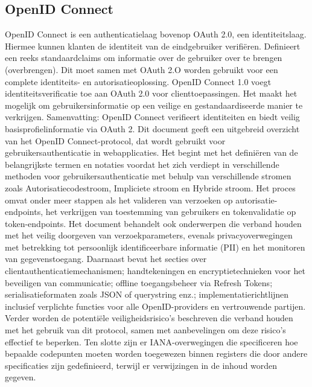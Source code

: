 \subsection{OpenID Connect}%
\label{subsec:openid-connect}
OpenID Connect is een authenticatielaag bovenop OAuth 2.0, een identiteitslaag. Hiermee kunnen klanten de identiteit van de eindgebruiker verifiëren. Definieert een reeks standaardclaims om informatie over de gebruiker over te brengen (overbrengen). Dit moet samen met OAuth 2.O worden gebruikt voor een complete identiteits- en autorisatieoplossing.
\newline
OpenID Connect 1.0 voegt identiteitsverificatie toe aan OAuth 2.0 voor clienttoepassingen.
Het maakt het mogelijk om gebruikersinformatie op een veilige en gestandaardiseerde manier te verkrijgen.
\newline
Samenvatting: OpenID Connect verifieert identiteiten en biedt veilig basisprofielinformatie via OAuth 2.
\newline
Dit document \autocite{Sakimura2014} geeft een uitgebreid overzicht van het OpenID Connect-protocol, dat wordt gebruikt voor gebruikersauthenticatie in webapplicaties. Het begint met het definiëren van de belangrijkste termen en notaties voordat het zich verdiept in verschillende methoden voor gebruikersauthenticatie met behulp van verschillende stromen zoals Autorisatiecodestroom, Impliciete stroom en Hybride stroom. Het proces omvat onder meer stappen als het valideren van verzoeken op autorisatie-endpoints, het verkrijgen van toestemming van gebruikers en tokenvalidatie op token-endpoints.
\newline
Het document behandelt ook onderwerpen die verband houden met het veilig doorgeven van verzoekparameters, evenals privacyoverwegingen met betrekking tot persoonlijk identificeerbare informatie (PII) en het monitoren van gegevenstoegang. Daarnaast bevat het secties over clientauthenticatiemechanismen; handtekeningen en encryptietechnieken voor het beveiligen van communicatie; offline toegangsbeheer via Refresh Tokens; serialisatieformaten zoals JSON of querystring enz.; implementatierichtlijnen inclusief verplichte functies voor alle OpenID-providers en vertrouwende partijen.
\newline
Verder worden de potentiële veiligheidsrisico's beschreven die verband houden met het gebruik van dit protocol, samen met aanbevelingen om deze risico's effectief te beperken. Ten slotte zijn er IANA-overwegingen die specificeren hoe bepaalde codepunten moeten worden toegewezen binnen registers die door andere specificaties zijn gedefinieerd, terwijl er verwijzingen in de inhoud worden gegeven.
